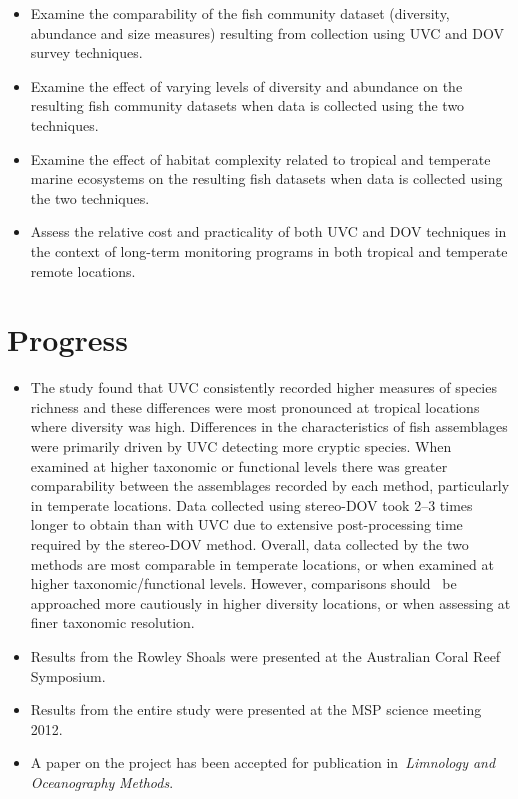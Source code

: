 \documentclass[version=last, paper=a4, DIV=18, usenames, dvipsnames]{scrartcl}
\begin{document}
\begin{itemize}

  \item Examine the comparability of the fish community dataset (diversity, abundance and size measures) resulting from collection using UVC and DOV survey techniques.

  \item Examine the effect of varying levels of diversity and abundance on the resulting fish community datasets when data is collected using the two techniques.

  \item Examine the effect of habitat complexity related to tropical and temperate marine ecosystems on the resulting fish datasets when data is collected using the two techniques.

  \item Assess the relative cost and practicality of both UVC and DOV techniques in the context of long-term monitoring programs in both tropical and temperate remote locations.

\end{itemize}






\section{Progress}



\begin{itemize}

  \item The study found that UVC consistently recorded higher measures of species richness and these differences were most pronounced at tropical locations where diversity was high. Differences in the characteristics of fish assemblages were primarily driven by UVC detecting more cryptic species. When examined at higher taxonomic or functional levels there was greater comparability between the assemblages recorded by each method, particularly in temperate locations. Data collected using stereo-DOV took 2–3 times longer to obtain than with UVC due to extensive post-processing time required by the stereo-DOV method. Overall, data collected by the two methods are most comparable in temperate locations, or when examined at higher taxonomic/functional levels. However, comparisons should  be approached more cautiously in higher diversity locations, or when assessing at finer taxonomic resolution.

  \item Results from the Rowley Shoals were presented at the Australian Coral Reef Symposium.

  \item Results from the entire study were presented at the MSP science meeting 2012.

  \item A paper on the project has been accepted for publication in \emph{Limnology and Oceanography} \emph{Methods}.

\end{itemize}
\end{document}
